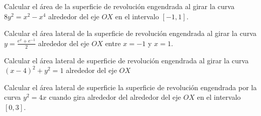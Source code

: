 \begin{ejercicio}
    Calcular el área de la superficie de revolución engendrada al girar la curva $8y^2=x^2-x^4$ alrededor del eje $OX$ en el intervalo $[-1,1]$.
\end{ejercicio}

\begin{ejercicio}
    Calcular el área lateral de la superficie de revolución engendrada al girar la curva $y=\frac{e^x + e^{-1}}{2}$ alrededor del eje $OX$ entre $x=-1$ y $x=1$.
\end{ejercicio}

\begin{ejercicio}
    Calcular el área lateral de superficie de revolución engendrada al girar la curva $(x-4)^2 +y^2=1$ alrededor del eje $OX$
\end{ejercicio}

\begin{ejercicio}
    Calcular el área lateral de superficie la superficie de revolución engendrada por la curva $y^2=4x$ cuando gira alrededor del alrededor del eje $OX$ en el intervalo $[0,3]$.
\end{ejercicio}